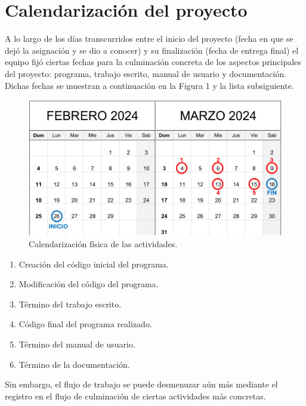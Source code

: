 \documentclass[a4paper,12pt]{article}
\begin{document}
\section{Calendarización del proyecto}

A lo largo de los días transcurridos entre el inicio del proyecto (fecha en que se dejó la asignación y se dio a conocer) y su finalización (fecha de entrega final) el equipo fijó ciertas fechas para la culminación concreta de los aspectos principales del proyecto: programa, trabajo escrito, manual de usuario y documentación. Dichas fechas se muestran a continuación en la Figura 1 y la lista subsiguiente.

\begin{figure}[ht]
    \centering
    \includegraphics[width=.9\textwidth]{media/calendarizacion.jpg}
    \caption{Calendarización física de las actividades.}
    \label{fig:calendarización}
\end{figure}

\begin{enumerate}
    \item Creación del código inicial del programa. 
    \item Modificación del código del programa.
    \item Término del trabajo escrito.
    \item Código final del programa realizado.
    \item Término del manual de usuario.
    \item Término de la documentación.
\end{enumerate}

Sin embargo, el flujo de trabajo se puede desmenuzar aún más mediante el registro en el flujo de culminación de ciertas actividades más concretas.
\end{document}
